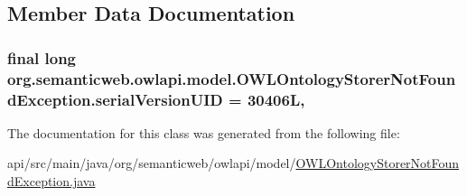 \subsection{Member Data Documentation}
\hypertarget{classorg_1_1semanticweb_1_1owlapi_1_1model_1_1_o_w_l_ontology_storer_not_found_exception_a3ab346f34e96cfabd03de25a4c321a96}{
\subsubsection[{serial\-Version\-U\-I\-D}]{\setlength{\rightskip}{0pt plus 5cm}final long org.\-semanticweb.\-owlapi.\-model.\-O\-W\-L\-Ontology\-Storer\-Not\-Found\-Exception.\-serial\-Version\-U\-I\-D = 30406\-L\hspace{0.3cm}{\ttfamily [static]}, {\ttfamily [private]}}}\label{classorg_1_1semanticweb_1_1owlapi_1_1model_1_1_o_w_l_ontology_storer_not_found_exception_a3ab346f34e96cfabd03de25a4c321a96}


The documentation for this class was generated from the following file\-:\begin{DoxyCompactItemize}
\item 
api/src/main/java/org/semanticweb/owlapi/model/\hyperlink{_o_w_l_ontology_storer_not_found_exception_8java}{O\-W\-L\-Ontology\-Storer\-Not\-Found\-Exception.\-java}\end{DoxyCompactItemize}
